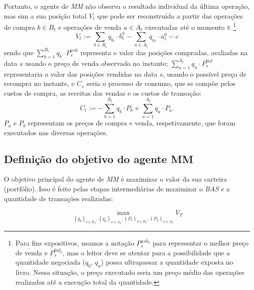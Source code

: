 Portanto, o agente de \textit{MM} não observa o resultado individual da última operação, mas sim a sua posição total $V_{t}$ que pode ser reconstruída a partir das operações de compra $b\in B_t$ e operações de venda $a\in A_t$ executadas até o momento \textit{t}: \footnote{Para fins expositivos, usamos a notação $P_s^{ask_0}$ para representar o melhor preço de venda e $P_s^{bid_0}$, mas o leitor deve se atentar para a possibilidade que a quantidade negociada ($q_b$, $q_a$) possa ultrapassar a quantidade exposta no livro. Nessa situação, o preço executado seria um preço médio das operações realizadas até a execução total da quantidade. }
\begin{equation}
    V_{t} := \sum_{b \in B_t} q_{b_{t}} \cdot b_{t}^{0} - \sum_{a \in A_t} q_{a_{t}} \cdot a_t^{0} - c
\end{equation}
sendo que $\sum_{b=1}^{B_t} q_b \cdot P_s^{ask} $ representa o valor das posições compradas, avaliadas na data $s$  usando o preço de venda observado no instante; $\sum_{a=1}^{A_t} q_a \cdot P_s^{bid}$ representaria o valor das posições vendidas na data $s$, usando o possível preço de recompra no instante, e $C_s$ seria o processo de consumo, que se compõe pelos custos de compra, as receitas das vendas e os custos de transação:
\begin{equation}
    C_t := -\sum_{b=1}^{B_t} q_b \cdot P_b + \sum_{a=1}^{A_t} q_a \cdot P_a.
\end{equation}
$P_a$ e $P_b$ representam os preços de compra e venda, respetivamente, que foram executados nas diversas operações.

\subsection{Definição do objetivo do agente MM}
O objetivo principal do agente de \textit{MM} é maximizar o valor da sua carteira (portfólio). Isso é feito pelas etapas intermediárias de maximizar o \textit{BAS} e a quantidade de transações realizadas:

\begin{equation}
    \max_{\left\{q_b \right\}_{b \in B_T}, \left\{q_a \right\}_{a \in A_T}, \left\{P_b \right\}_{b \in B_T}, \left\{P_a \right\}_{a \in A_T} 
    } V_T \label{eq:target_fct}
\end{equation}

